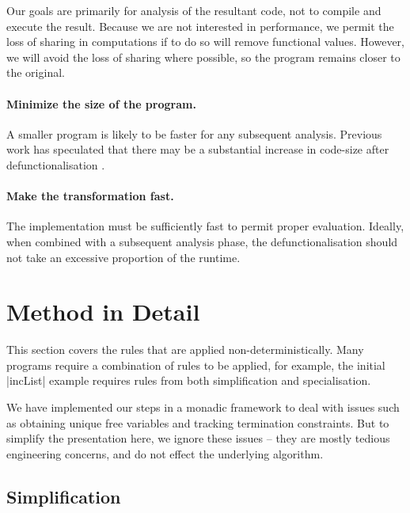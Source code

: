 \documentclass[preprint]{sigplanconf}
\begin{document}
Our goals are primarily for analysis of the resultant code, not to compile and execute the result. Because we are not interested in performance, we permit the loss of sharing in computations if to do so will remove functional values. However, we will avoid the loss of sharing where possible, so the program remains closer to the original.

\paragraph{Minimize the size of the program.} A smaller program is likely to be faster for any subsequent analysis. Previous work has speculated that there may be a substantial increase in code-size after defunctionalisation \cite{chin:higher_order_removal}.

\paragraph{Make the transformation fast.} The implementation must be sufficiently fast to permit proper evaluation. Ideally, when combined with a subsequent analysis phase, the defunctionalisation should not take an excessive proportion of the runtime.


\section{Method in Detail}
\label{sec:detailed}

\begin{comment}
\begin{code}
data Prog = Prog deriving Eq
simplify,arity,inline,specialise :: Prog -> Prog
\end{code}
\end{comment}

This section covers the rules that are applied non-deterministically. Many programs require a combination of rules to be applied, for example, the initial |incList| example requires rules from both simplification and specialisation.

We have implemented our steps in a monadic framework to deal with issues such as obtaining unique free variables and tracking termination constraints. But to simplify the presentation here, we ignore these issues -- they are mostly tedious engineering concerns, and do not effect the underlying algorithm.

\subsection{Simplification}
\label{sec:simplification_detail}
\end{document}
